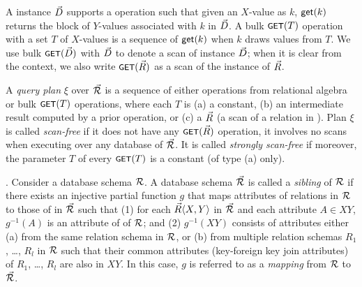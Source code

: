\vspace{0.6ex}
A \baav instance $\vec{D}$ supports a \get operation such that given
an $X$-value as $k$, $\protect\mathsf{get}(k)$ returns the block of
$Y$-values associated with $k$ in $\vec{D}$.
%
A bulk $\text{\footnotesize \protect\ensuremath{\mathsf{GET}}}(T)$ operation with a set $T$ of $X$-values is a
sequence of $\protect\mathsf{get}(k)$ when $k$ draws values from $T$.
  We use 
bulk $\text{\footnotesize \protect\ensuremath{\mathsf{GET}}}(\vec{D})$ with $\vec{D}$ to denote a scan of \baav instance
$\vec{D}$; when it is clear from the context, we also write
$\text{\footnotesize \protect\ensuremath{\mathsf{GET}}}(\vec{R})$ as a scan of the instance of \bs $\vec{R}$.


A {\em query plan} $\xi$ over $\vec{{\mathcal R}}$ is a sequence
of either operations
from relational algebra or bulk $\text{\footnotesize \protect\ensuremath{\mathsf{GET}}}(T)$ operations, where each $T$ is
(a) a constant, %
(b) an intermediate result computed by a prior operation, or
(c) a \bs $\vec{R}$ (\ie a scan of a relation in \baav).
Plan
$\xi$ is called {\em scan-free} if it does not have any
$\text{\footnotesize \protect\ensuremath{\mathsf{GET}}}(\vec{R})$
operation, \ie it involves no scans when executing over any \baav
database of $\vec{{\mathcal R}}$. It is called {\em strongly scan-free}
if moreover, 
the parameter $T$ of every $\text{\footnotesize \protect\ensuremath{\mathsf{GET}}}(T)$ is a constant (\ie of type (a) only).

\vspace{0.6ex}






.
Consider  a database schema ${\mathcal R}$.
A \baav database schema $\vec{{\mathcal R}}$ is called
a {\em sibling} of ${\mathcal R}$
if there exists an injective partial function $g$ that 
maps attributes of relations in ${\mathcal R}$ to those of \bss in
$\vec{{\mathcal R}}$ such that
(1) for each $\vec{R}\langle X,\allowbreak Y\rangle$ in $\vec{{\mathcal R}}$ and each
attribute $A\in XY$, $g^{-1}(A)$ is an attribute of of ${\mathcal R}$;
and (2) $g^{-1}(XY)$ consists of attributes either
(a) from the same relation schema in ${\mathcal R}$, or
(b) from multiple relation schemas $R_{1}$, \ldots, $R_{l}$ in
${\mathcal R}$ such that their common attributes (\ie key-foreign
key join attributes) of $R_{1}$, \ldots, $R_{l}$ are also in $XY$.
In this case, $g$ is referred to as a {\em mapping} from ${\mathcal R}$ to
$\vec{{\mathcal R}}$.


